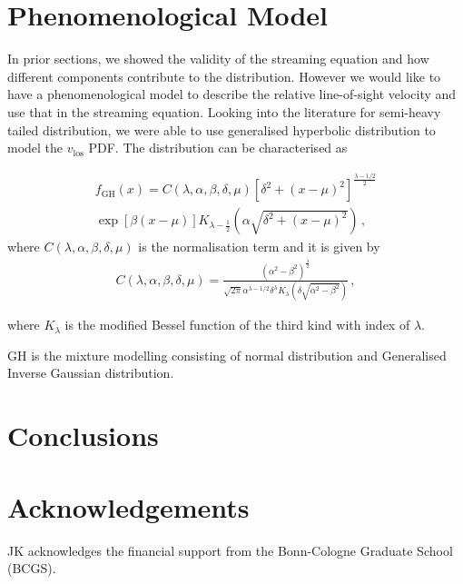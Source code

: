 \documentclass[a4paper,fleqn,usenatbib]{mnras}
\begin{document}
	\section{Phenomenological Model}

	In prior sections, we showed the validity of the streaming equation and how different components contribute to the distribution. However we would like to have a phenomenological model to describe the relative line-of-sight velocity and use that in the streaming equation. Looking into the literature for semi-heavy tailed distribution, we were able to use generalised hyperbolic distribution to model the $v_{\mathrm{los}}$ PDF. The distribution can be characterised as
	
	\begin{multline}
		f_{\mathrm{GH}}(x) = C\left(\lambda, \alpha,\beta,\delta,\mu\right) \left[\delta^2+\left(x-\mu\right)^2\right]^{\frac{\lambda-1/2}{2}}  \\
		\exp\left[\beta\left(x-\mu\right)\right] K_{\lambda-\frac{1}{2}}\left(\alpha\sqrt{\delta^2+(x-\mu)^2}\right) \, ,
	\end{multline}
	\noindent where $C\left(\lambda, \alpha,\beta,\delta,\mu\right)$ is the normalisation term and it is given by
	\begin{eqnarray}
		C\left(\lambda, \alpha,\beta,\delta,\mu\right) = \frac{\left(\alpha^2-\beta^2\right)^{\frac{\lambda}{2}}}{\sqrt{2\pi}\alpha^{\lambda - 1/2}\delta^\lambda K_{\lambda}\left(\delta\sqrt{\alpha^2-\beta^2}\right)}  \, ,
	\end{eqnarray}
	
	\noindent where $K_{\lambda}$ is the modified Bessel function of the third kind with index of $\lambda$.
	
	GH is the mixture modelling consisting of normal distribution and Generalised Inverse Gaussian distribution. 
	
	\section{Conclusions}
	
	
	\section*{Acknowledgements}
	
	JK acknowledges the financial support from the Bonn-Cologne
	Graduate School (BCGS).
	
	
\end{document}
